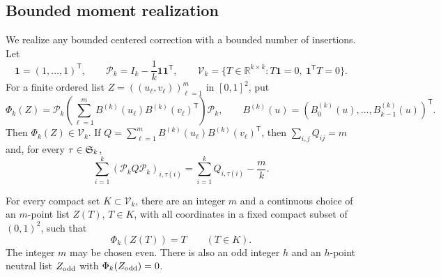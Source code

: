 \subsection{Bounded moment realization}
We realize any bounded centered correction with a bounded number of insertions.
Let
\[
 \mathbf1=(1,\ldots,1)^{\mathsf T},\qquad
 \mathcal P_k=I_k-\frac1k\mathbf1\mathbf1^{\mathsf T},\qquad
 \mathcal V_k=\{T\in\mathbb R^{k\times k}:T\mathbf1=0,\ \mathbf1^{\mathsf T}T=0\}.
\]
For a finite ordered list $Z=((u_\ell,v_\ell))_{\ell=1}^m$ in $[0,1]^2$, put
\[
 \Phi_k(Z)=\mathcal P_k\left(\sum_{\ell=1}^m
 B^{(k)}(u_\ell)B^{(k)}(v_\ell)^{\mathsf T}\right)\mathcal P_k,
 \qquad
 B^{(k)}(u)=(B^{(k)}_0(u),\ldots,B^{(k)}_{k-1}(u))^{\mathsf T}.
\]
Then $\Phi_k(Z)\in\mathcal V_k$.  If
$Q=\sum_{\ell=1}^mB^{(k)}(u_\ell)B^{(k)}(v_\ell)^{\mathsf T}$, then
$\sum_{i,j}Q_{ij}=m$ and, for every $\tau\in\mathfrak S_k$,
\begin{equation}\label{eq:centered-assignment}
 \sum_{i=1}^k(\mathcal P_kQ\mathcal P_k)_{i,\tau(i)}
 =\sum_{i=1}^kQ_{i,\tau(i)}-\frac mk.
\end{equation}

\begin{lemma}\label{lem:moment-realization}
For every compact set $K\subset\mathcal V_k$, there are an integer $m$ and a
continuous choice of an $m$-point list $Z(T)$, $T\in K$, with all coordinates
in a fixed compact subset of $(0,1)^2$, such that
\[
 \Phi_k(Z(T))=T\qquad(T\in K).
\]
The integer $m$ may be chosen even.  There is also an odd integer $h$ and an
$h$-point neutral list $Z_{\rm odd}$ with $\Phi_k(Z_{\rm odd})=0$.
\end{lemma}

